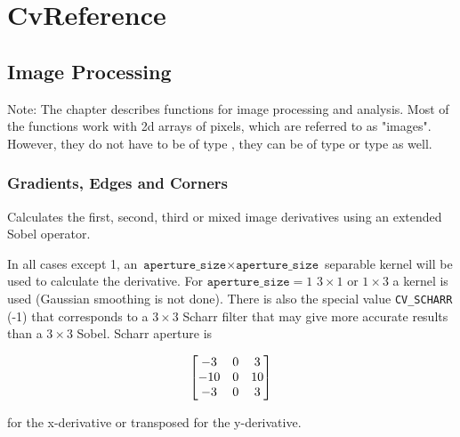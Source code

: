 \chapter{CvReference}
\section{Image Processing}


Note: The chapter describes functions for image processing and
analysis. Most of the functions work with 2d arrays of pixels, which are referred
to as "images". However, they do not have to be of type
, they can be of type  or type  as well.

\subsection{Gradients, Edges and Corners}

\label{Sobel}
\label{Sobel}
Calculates the first, second, third or mixed image derivatives using an extended Sobel operator.

\begin{description}
\end{description}

In all cases except 1, an $\texttt{aperture\_size} \times
\texttt{aperture\_size}$ separable kernel will be used to calculate the
derivative. For $\texttt{aperture\_size} = 1$ $ 3 \times 1$ or $ 1 \times 3$
a kernel is used (Gaussian smoothing is not done). There is also the special
value \texttt{CV\_SCHARR} (-1) that corresponds to a $3\times3$ Scharr
filter that may give more accurate results than a $3\times3$ Sobel. Scharr
aperture is

\[ \begin{bmatrix} -3 & 0 & 3\\ -10 & 0 & 10\\ -3 & 0 & 3 \end{bmatrix}
\]

for the x-derivative or transposed for the y-derivative.

